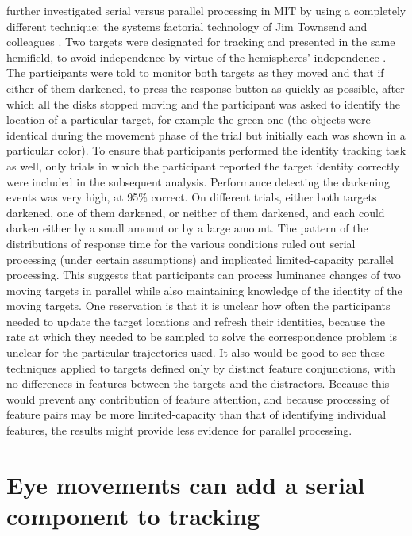 \documentclass[
]{book}
\begin{document}
\citet{howeIdentityLocationBindingProblem2015a} further investigated serial versus parallel processing in MIT by using a completely different technique: the systems factorial technology of Jim Townsend and colleagues \citep{townsendSerialVsParallel1990}. Two targets were designated for tracking and presented in the same hemifield, to avoid independence by virtue of the hemispheres' independence \citep{alvarezIndependentResourcesAttentional2005}. The participants were told to monitor both targets as they moved and that if either of them darkened, to press the response button as quickly as possible, after which all the disks stopped moving and the participant was asked to identify the location of a particular target, for example the green one (the objects were identical during the movement phase of the trial but initially each was shown in a particular color). To ensure that participants performed the identity tracking task as well, only trials in which the participant reported the target identity correctly were included in the subsequent analysis. Performance detecting the darkening events was very high, at 95\% correct. On different trials, either both targets darkened, one of them darkened, or neither of them darkened, and each could darken either by a small amount or by a large amount. The pattern of the distributions of response time for the various conditions ruled out serial processing (under certain assumptions) and implicated limited-capacity parallel processing. This suggests that participants can process luminance changes of two moving targets in parallel while also maintaining knowledge of the identity of the moving targets. One reservation is that it is unclear how often the participants needed to update the target locations and refresh their identities, because the rate at which they needed to be sampled to solve the correspondence problem is unclear for the particular trajectories used. It also would be good to see these techniques applied to targets defined only by distinct feature conjunctions, with no differences in features between the targets and the distractors. Because this would prevent any contribution of feature attention, and because processing of feature pairs may be more limited-capacity than that of identifying individual features, the results might provide less evidence for parallel processing.

\hypertarget{eye-movements-can-add-a-serial-component-to-tracking}{%
\section{Eye movements can add a serial component to tracking}\label{eye-movements-can-add-a-serial-component-to-tracking}}
\end{document}
